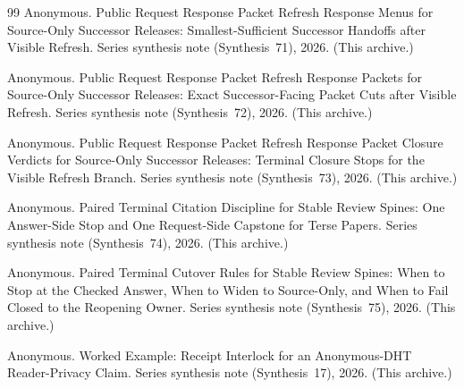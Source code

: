 \documentclass[11pt]{article}
\begin{document}
\begin{thebibliography}{99}
Anonymous.
\newblock Public Request Response Packet Refresh Response Menus for Source-Only Successor Releases: Smallest-Sufficient Successor Handoffs after Visible Refresh.
\newblock Series synthesis note (Synthesis~71), 2026. (This archive.)

Anonymous.
\newblock Public Request Response Packet Refresh Response Packets for Source-Only Successor Releases: Exact Successor-Facing Packet Cuts after Visible Refresh.
\newblock Series synthesis note (Synthesis~72), 2026. (This archive.)

Anonymous.
\newblock Public Request Response Packet Refresh Response Packet Closure Verdicts for Source-Only Successor Releases: Terminal Closure Stops for the Visible Refresh Branch.
\newblock Series synthesis note (Synthesis~73), 2026. (This archive.)

Anonymous.
\newblock Paired Terminal Citation Discipline for Stable Review Spines: One Answer-Side Stop and One Request-Side Capstone for Terse Papers.
\newblock Series synthesis note (Synthesis~74), 2026. (This archive.)

Anonymous.
\newblock Paired Terminal Cutover Rules for Stable Review Spines: When to Stop at the Checked Answer, When to Widen to Source-Only, and When to Fail Closed to the Reopening Owner.
\newblock Series synthesis note (Synthesis~75), 2026. (This archive.)

Anonymous.
\newblock Worked Example: Receipt Interlock for an Anonymous-DHT Reader-Privacy Claim.
\newblock Series synthesis note (Synthesis~17), 2026. (This archive.)

\end{thebibliography}
\end{document}
